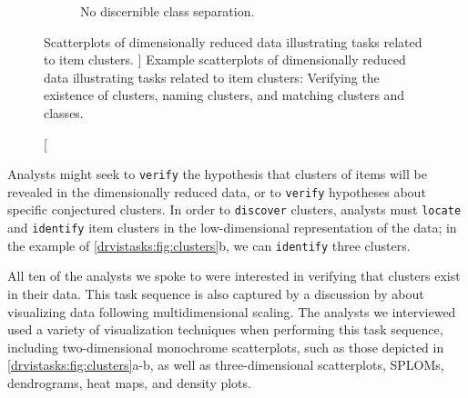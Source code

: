 \begin{figure}
\begin{subfigure}[t]{0.45\textwidth}
        \caption{No discernible class separation.}
    \end{subfigure}
	\caption
	[
	    Scatterplots of dimensionally reduced data illustrating tasks related to item clusters.
	]
	{
    	Example scatterplots of dimensionally reduced data illustrating tasks related to item clusters: Verifying the existence of clusters, naming clusters, and matching clusters and classes.
	}
	\centering
	\label{drvistasks:fig:clusters}
\end{figure}






Analysts might seek to {\tt verify} the hypothesis that clusters of items will be revealed in the dimensionally reduced data, or to {\tt verify} hypotheses about specific conjectured clusters.
In order to {\tt discover} clusters, analysts must {\tt locate} and {\tt identify} item clusters in the low-dimensional representation of the data; in the example of \autoref{drvistasks:fig:clusters}b, we can {\tt identify} three clusters.

All ten of the analysts we spoke to were interested in verifying that clusters exist in their data. 
This task sequence is also captured by a discussion by \citet{Buja2002} about visualizing data following multidimensional scaling. 
The analysts we interviewed used a variety of visualization techniques when performing this task sequence, including two-dimensional monochrome scatterplots, such as those depicted in \autoref{drvistasks:fig:clusters}a-b, as well as three-dimensional scatterplots, \ac{SPLOM}s, dendrograms, heat maps, and density plots. 

